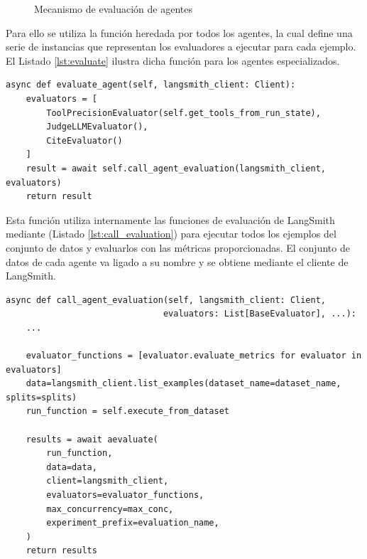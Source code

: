 \begin{figure}[h]
\centering
{}
\caption{Mecanismo de evaluación de agentes}
\label{fig:mem_1}
\end{figure}

Para ello se utiliza la función  heredada por todos los agentes, la cual define una serie de instancias  que representan los evaluadores a ejecutar para cada ejemplo. El Listado \ref{lst:evaluate} ilustra dicha función para los agentes especializados.

\begin{lstlisting}[caption={Evaluación de agentes especializados},label={lst:evaluate}]
async def evaluate_agent(self, langsmith_client: Client):
    evaluators = [
        ToolPrecisionEvaluator(self.get_tools_from_run_state),
        JudgeLLMEvaluator(),
        CiteEvaluator()
    ]
    result = await self.call_agent_evaluation(langsmith_client, evaluators)
    return result
\end{lstlisting}

Esta función utiliza internamente las funciones de evaluación de LangSmith mediante  (Listado \ref{lst:call_evaluation}) para ejecutar todos los ejemplos del conjunto de datos y evaluarlos con las métricas proporcionadas. El conjunto de datos de cada agente va ligado a su nombre y se obtiene mediante el cliente de LangSmith.

\begin{lstlisting}[caption={Llamada a evaluación de agentes},label={lst:call_evaluation}]
async def call_agent_evaluation(self, langsmith_client: Client, 
                               evaluators: List[BaseEvaluator], ...):
    ...

    evaluator_functions = [evaluator.evaluate_metrics for evaluator in evaluators]
    data=langsmith_client.list_examples(dataset_name=dataset_name, splits=splits)
    run_function = self.execute_from_dataset

    results = await aevaluate(
        run_function,
        data=data,
        client=langsmith_client,
        evaluators=evaluator_functions,
        max_concurrency=max_conc,
        experiment_prefix=evaluation_name,
    )
    return results
\end{lstlisting}

